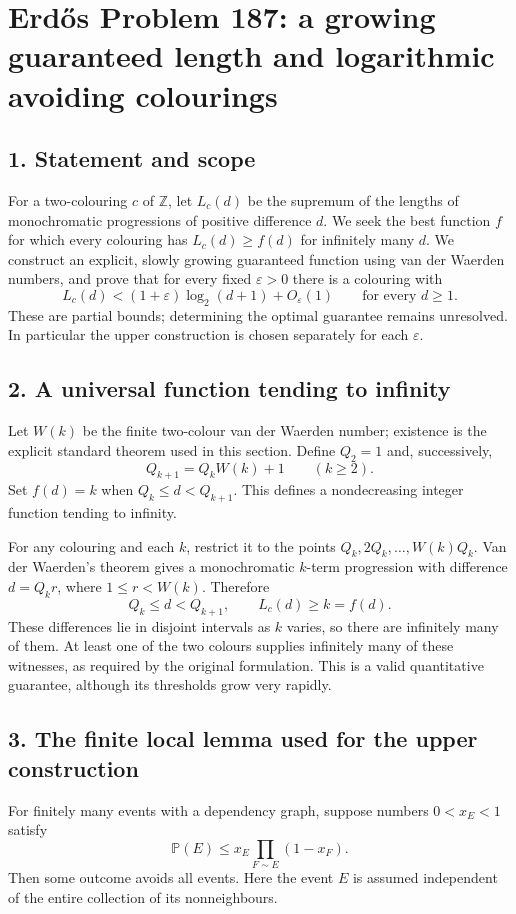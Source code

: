 \section*{Erd\H{o}s Problem 187: a growing guaranteed length and logarithmic avoiding colourings}

\subsection*{1. Statement and scope}
For a two-colouring $c$ of $\mathbb Z$, let $L_c(d)$ be the supremum of the lengths of monochromatic progressions of positive difference $d$. We seek the best function $f$ for which every colouring has $L_c(d)\ge f(d)$ for infinitely many $d$. We construct an explicit, slowly growing guaranteed function using van der Waerden numbers, and prove that for every fixed $\varepsilon>0$ there is a colouring with
\[
 L_c(d)<(1+\varepsilon)\log_2(d+1)+O_\varepsilon(1)
 \qquad\text{for every }d\ge1.\tag{1}
\]
These are partial bounds; determining the optimal guarantee remains unresolved. In particular the upper construction is chosen separately for each $\varepsilon$.

\subsection*{2. A universal function tending to infinity}
Let $W(k)$ be the finite two-colour van der Waerden number; existence is the explicit standard theorem used in this section. Define $Q_2=1$ and, successively,
\[
 Q_{k+1}=Q_kW(k)+1\qquad(k\ge2).
\]
Set $f(d)=k$ when $Q_k\le d<Q_{k+1}$. This defines a nondecreasing integer function tending to infinity.

For any colouring and each $k$, restrict it to the points $Q_k,2Q_k,\ldots,W(k)Q_k$. Van der Waerden's theorem gives a monochromatic $k$-term progression with difference $d=Q_kr$, where $1\le r<W(k)$. Therefore
\[
 Q_k\le d<Q_{k+1},\qquad L_c(d)\ge k=f(d).
\]
These differences lie in disjoint intervals as $k$ varies, so there are infinitely many of them. At least one of the two colours supplies infinitely many of these witnesses, as required by the original formulation. This is a valid quantitative guarantee, although its thresholds grow very rapidly.

\subsection*{3. The finite local lemma used for the upper construction}
For finitely many events with a dependency graph, suppose numbers $0<x_E<1$ satisfy
\[
 \mathbb P(E)\le x_E\prod_{F\sim E}(1-x_F).\tag{2}
\]
Then some outcome avoids all events. Here the event $E$ is assumed independent of the entire collection of its nonneighbours.

